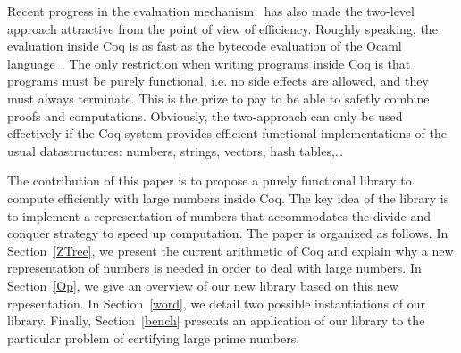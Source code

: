 Recent progress in the evaluation mechanism~\cite{GreLer} has also made the two-level
approach attractive from the point of view of efficiency. Roughly speaking,
the evaluation inside Coq is as fast as the bytecode evaluation of
the {\sc Ocaml} language~\cite{Ocaml}. The only restriction when writing programs
inside {\sc Coq} is that programs must be purely functional, i.e. no side effects are allowed,
and they must always terminate. This is the prize to pay to be able to safetly combine proofs
and computations. Obviously, the two-approach can only be used effectively if 
the {\sc Coq} system provides efficient functional implementations of the
usual datastructures: numbers, strings, vectors, hash tables,\dots 

The contribution of this paper is to propose a purely functional library to compute 
efficiently with large numbers inside {\sc Coq}. The key idea of the library is to 
implement a representation of numbers that accommodates the divide and conquer strategy 
to speed up computation. The paper is organized as follows. In Section~\ref{ZTree}, we present 
the current arithmetic of {\sc Coq} and explain why a new representation of numbers is needed
in order to deal with large numbers. In Section~\ref{Op}, we give an overview of our new library
based on this new repesentation.  
In Section~\ref{word}, we detail two possible instantiations of our library.
Finally, Section~\ref{bench} presents an application of our library to the particular
problem of certifying large prime numbers.